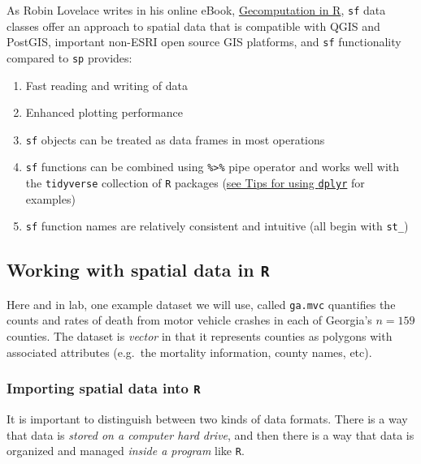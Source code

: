 \documentclass[
]{book}
\providecommand{\tightlist}{%
  \setlength{\itemsep}{0pt}\setlength{\parskip}{0pt}}
\begin{document}
As Robin Lovelace writes in his online eBook, \href{https://geocompr.robinlovelace.net/}{Gecomputation in R}, \texttt{sf} data classes offer an approach to spatial data that is compatible with QGIS and PostGIS, important non-ESRI open source GIS platforms, and \texttt{sf} functionality compared to \texttt{sp} provides:

\begin{enumerate}
\def\labelenumi{\arabic{enumi}.}
\tightlist
\item
  Fast reading and writing of data
\item
  Enhanced plotting performance
\item
  \texttt{sf} objects can be treated as data frames in most operations
\item
  \texttt{sf} functions can be combined using \texttt{\%\textgreater{}\%} pipe operator and works well with the \texttt{tidyverse} collection of \texttt{R} packages (\protect\hyperlink{dplyr}{see Tips for using \texttt{dplyr}} for examples)
\item
  \texttt{sf} function names are relatively consistent and intuitive (all begin with \texttt{st\_})
\end{enumerate}

\hypertarget{working-with-spatial-data-in-r}{%
\subsection{\texorpdfstring{Working with spatial data in \texttt{R}}{Working with spatial data in R}}\label{working-with-spatial-data-in-r}}

Here and in lab, one example dataset we will use, called \texttt{ga.mvc} quantifies the counts and rates of death from motor vehicle crashes in each of Georgia's \(n=159\) counties. The dataset is \emph{vector} in that it represents counties as polygons with associated attributes (e.g.~the mortality information, county names, etc).

\hypertarget{importing-spatial-data-into-r}{%
\subsubsection{\texorpdfstring{Importing spatial data into \texttt{R}}{Importing spatial data into R}}\label{importing-spatial-data-into-r}}

It is important to distinguish between two kinds of data formats. There is a way that data is \emph{stored on a computer hard drive}, and then there is a way that data is organized and managed \emph{inside a program} like \texttt{R}.
\end{document}
